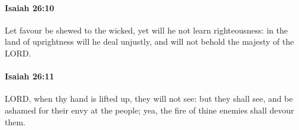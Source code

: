 		\paragraph{Isaiah 26:10} %
			\label{ISAIAH-26-10}

			Let favour be shewed to the wicked, yet will he not learn righteousness: in the land of uprightness will he deal unjustly, and will not behold the majesty of the LORD.


		\paragraph{Isaiah 26:11} %
			\label{ISAIAH-26-11}

			LORD, when thy hand is lifted up, they will not see: but they shall see, and be ashamed for their envy at the people; yea, the fire of thine enemies shall devour them.


